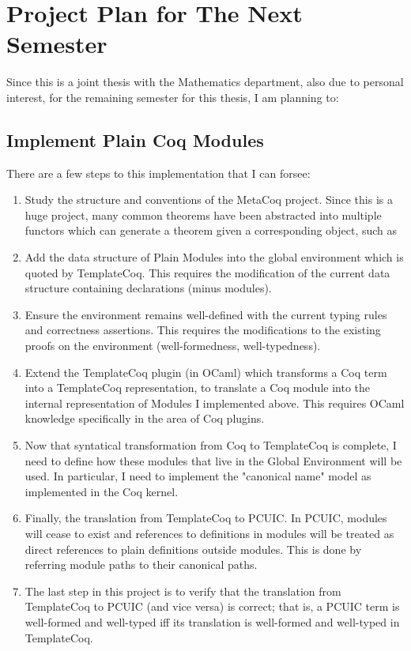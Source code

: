 \chapter{Project Plan for The Next Semester}

Since this is a joint thesis with the Mathematics department, also due to 
personal interest, for the remaining semester for this thesis, I am planning to:

\section{Implement Plain Coq Modules}
There are a few steps to this implementation that I can forsee:
\begin{enumerate}
\item Study the structure and conventions of the MetaCoq project. Since this is 
    a huge project, many common theorems have been abstracted into multiple
    functors which can generate a theorem given a corresponding object, such as
\item Add the data structure of Plain Modules into the global environment which
    is quoted by TemplateCoq. This requires the modification of the current data
    structure containing declarations (minus modules). 
\item Ensure the environment remains well-defined with the current typing rules
    and correctness assertions. This requires the modifications to the existing 
    proofs on the environment (well-formedness, well-typedness).
\item Extend the TemplateCoq plugin (in OCaml) which transforms a Coq term into 
    a TemplateCoq representation, to translate a Coq module into the internal
    representation of Modules I implemented above. This requires OCaml knowledge
    specifically in the area of Coq plugins.
\item Now that syntatical transformation from Coq to TemplateCoq is complete, I
    need to define how these modules that live in the Global Environment will 
    be used. In particular, I need to implement the "canonical name" model as
    implemented in the Coq kernel.
\item Finally, the translation from TemplateCoq to PCUIC. In PCUIC,
    modules will cease to exist and references to definitions in modules will be
    treated as direct references to plain definitions outside modules. This is
    done by referring module paths to their canonical paths.
\item The last step in this project is to verify that the translation from
    TemplateCoq to PCUIC (and vice versa) is correct; that is, a PCUIC term is 
    well-formed and well-typed iff its translation is well-formed and well-typed
    in TemplateCoq.
\end{enumerate}


